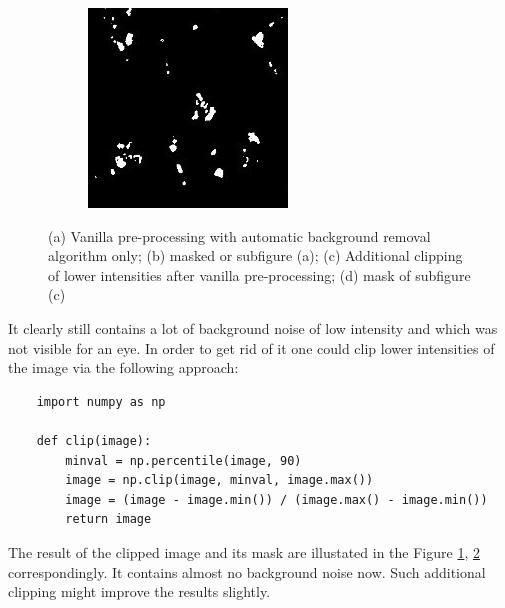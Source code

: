 \begin{figure}[htb]
\begin{subfigure}[b]{0.22\textwidth}
		\caption{}
		\label{subfig:clipping}
	\end{subfigure}
	\hfill
	\begin{subfigure}[b]{0.22\textwidth}
		\centering
		\includegraphics[width=\textwidth]{bilder/preprocessing/crop_golgi_full_processed_mask.png}
		\caption{}
		\label{subfig:clipping-mask}
	\end{subfigure}
	   \caption{(a) Vanilla pre-processing with automatic background removal algorithm only; (b) masked or subfigure (a); (c) Additional clipping of lower intensities after vanilla pre-processing; (d) mask of subfigure (c)}
	   \label{fig:pre-processing-golgi}
\end{figure}
It clearly still contains a lot of background noise of low intensity and which was not visible for an eye. In order to get rid of it one could clip lower intensities of the image via the following approach:
\begin{lstlisting}
	import numpy as np
		
	def clip(image):
		minval = np.percentile(image, 90)
		image = np.clip(image, minval, image.max())
		image = (image - image.min()) / (image.max() - image.min())
		return image
\end{lstlisting}

The result of the clipped image and its mask are illustated in the Figure \ref{subfig:clipping}, \ref{subfig:clipping-mask} correspondingly. It contains almost no background noise now. Such additional clipping might improve the results slightly.
